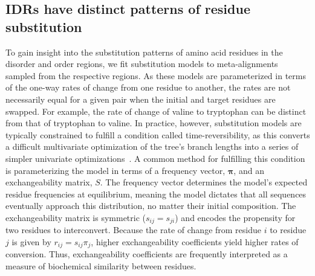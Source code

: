 \subsection{IDRs have distinct patterns of residue substitution}
To gain insight into the substitution patterns of amino acid residues in the disorder and order regions, we fit substitution models to meta-alignments sampled from the respective regions. As these models are parameterized in terms of the one-way rates of change from one residue to another, the rates are not necessarily equal for a given pair when the initial and target residues are swapped. For example, the rate of change of valine to tryptophan can be distinct from that of tryptophan to valine. In practice, however, substitution models are typically constrained to fulfill a condition called time-reversibility, as this converts a difficult multivariate optimization of the tree's branch lengths into a series of simpler univariate optimizations~\cite{Felsenstein1981}. A common method for fulfilling this condition is parameterizing the model in terms of a frequency vector, $\boldsymbol \pi$, and an exchangeability matrix, $S$. The frequency vector determines the model's expected residue frequencies at equilibrium, meaning the model dictates that all sequences eventually approach this distribution, no matter their initial composition. The exchangeability matrix is symmetric ($s_{ij} = s_{ji}$) and encodes the propensity for two residues to interconvert. Because the rate of change from residue $i$ to residue $j$ is given by $r_{ij} = s_{ij}\pi_{j}$, higher exchangeability coefficients yield higher rates of conversion. Thus, exchangeability coefficients are frequently interpreted as a measure of biochemical similarity between residues.

